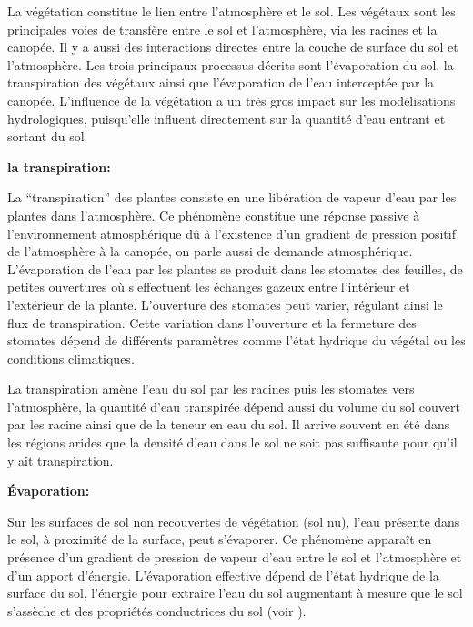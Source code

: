 \documentclass[a4paper,11pt]{article}
\numberwithin{equation}{section}
\begin{document}
La végétation constitue le lien entre l'atmosphère et le sol. Les végétaux sont les principales voies de transfère entre le sol et l'atmosphère, via les racines et la canopée. Il y a aussi des interactions directes entre la couche de surface du sol et l'atmosphère. Les trois principaux processus décrits sont l'évaporation du sol, la transpiration des végétaux ainsi que l'évaporation de l'eau interceptée par la canopée. L'influence de la végétation a un très gros impact sur les modélisations hydrologiques, puisqu'elle influent directement sur la quantité d'eau entrant et sortant du sol. 

\vspace{0.7cm}

\noindent\textbf{la transpiration:}

La ``transpiration'' des plantes consiste en une libération de vapeur d’eau par les plantes dans l’atmosphère. Ce phénomène constitue une réponse passive à l’environnement atmosphérique dû à l’existence d’un gradient de pression positif de l’atmosphère à la canopée, on parle aussi de demande atmosphérique. L’évaporation de l’eau par les plantes se produit dans les stomates des feuilles, de petites ouvertures où s’effectuent les échanges gazeux entre l’intérieur et l’extérieur de la plante. L’ouverture des stomates peut varier, régulant ainsi le flux de transpiration. Cette variation dans l’ouverture et la fermeture des stomates dépend de différents paramètres comme l’état hydrique du végétal ou les conditions climatiques.

La transpiration amène l'eau du sol par les racines puis les stomates vers l'atmosphère, la quantité d'eau transpirée dépend aussi du volume du sol couvert par les racine ainsi que de la teneur en eau du sol. Il arrive souvent en été dans les régions arides que la densité d'eau dans le sol ne soit pas suffisante pour qu'il y ait transpiration.

\vspace{0.7cm}

\noindent\textbf{Évaporation:}

Sur les surfaces de sol non recouvertes de végétation (sol nu), l’eau présente dans le sol, à proximité de la surface, peut s’évaporer. Ce phénomène apparaît en présence d’un gradient de pression de vapeur d’eau entre le sol et l’atmosphère et d’un apport d’énergie. L’évaporation effective dépend de l’état hydrique de la surface du sol, l’énergie pour extraire l’eau du sol augmentant à mesure que le sol s’assèche et des propriétés conductrices du sol (voir \cite{hillel2003introduction}).
\end{document}
